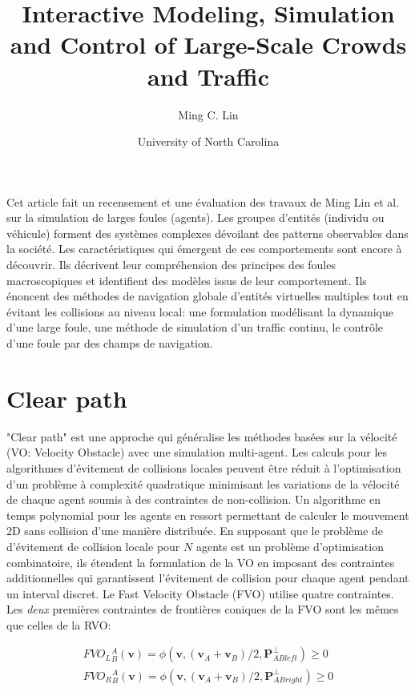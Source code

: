 \documentclass[11pt]{article}
\title{Interactive Modeling, Simulation and Control of Large-Scale Crowds and Traffic}
\author{Ming C. Lin}
\date{University of North Carolina}
\begin{document}
\maketitle

Cet article fait un recensement et une évaluation des travaux de Ming Lin et al. sur la simulation de larges foules (agents).
Les groupes d'entités (individu ou véhicule) forment des systèmes complexes dévoilant des patterns observables dans la société.
Les caractéristiques qui émergent de ces comportements sont encore à découvrir.
Ils décrivent leur compréhension des principes des foules macroscopiques et identifient des modèles issus de leur comportement.
Ils énoncent des méthodes de navigation globale d'entités virtuelles multiples tout en évitant les collisions au niveau local: une formulation modélisant la dynamique d'une large foule, une méthode de simulation d'un traffic continu, le contrôle d'une foule par des champs de navigation.

\section{Clear path}

"Clear path" est une approche qui généralise les méthodes basées sur la vélocité (VO: Velocity Obstacle) avec une simulation multi-agent. Les calculs pour les algorithmes d'évitement de collisions locales peuvent être réduit à l'optimisation d'un problème à complexité quadratique minimisant les variations de la vélocité de chaque agent soumis à des contraintes de non-collision. Un algorithme en temps polynomial pour les agents en ressort permettant de calculer le mouvement 2D sans collision d'une manière distribuée. En supposant que le problème de d'évitement de collision locale pour $N$ agents est un problème d'optimisation combinatoire, ils étendent la formulation de la VO en imposant des contraintes additionnelles qui garantissent l'évitement de collision pour chaque agent pendant un interval discret. Le Fast Velocity Obstacle (FVO) utilise quatre contraintes. Les \textit{deux} premières contraintes de frontières coniques de la FVO sont les mêmes que celles de la RVO:

\begin{eqnarray}
FVO_L{}_B^A(\textbf{v}) = \phi(\textbf{v}, (\textbf{v}_A + \textbf{v}_B)/2, \textbf{P}_{ABleft}^\perp) \geq 0 \\
FVO_R{}_B^A(\textbf{v}) = \phi(\textbf{v}, (\textbf{v}_A + \textbf{v}_B)/2, \textbf{P}_{ABright}^\perp) \geq 0 
\end{eqnarray}
\end{document}
